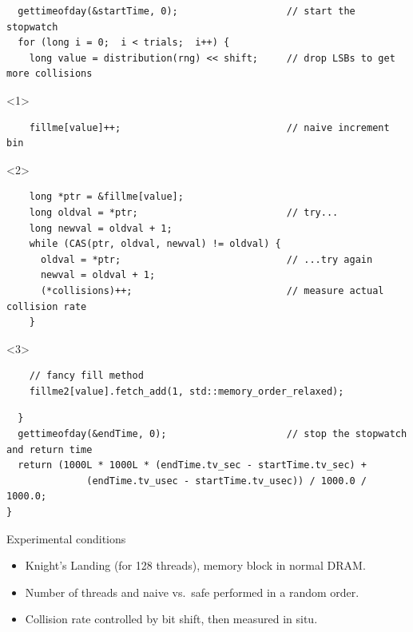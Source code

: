 \documentclass{beamer}
\begin{document}
\begin{frame}[fragile]{}
\begin{verbatim}
  gettimeofday(&startTime, 0);                   // start the stopwatch
  for (long i = 0;  i < trials;  i++) {
    long value = distribution(rng) << shift;     // drop LSBs to get more collisions
\end{verbatim}
\begin{onlyenv}<1>
\begin{verbatim}
    fillme[value]++;                             // naive increment bin
\end{verbatim}
\end{onlyenv}
\begin{onlyenv}<2>
\begin{verbatim}
    long *ptr = &fillme[value];
    long oldval = *ptr;                          // try...
    long newval = oldval + 1;
    while (CAS(ptr, oldval, newval) != oldval) {
      oldval = *ptr;                             // ...try again
      newval = oldval + 1;
      (*collisions)++;                           // measure actual collision rate
    }
\end{verbatim}
\end{onlyenv}
\begin{onlyenv}<3>
\begin{verbatim}
    // fancy fill method
    fillme2[value].fetch_add(1, std::memory_order_relaxed);
\end{verbatim}
\end{onlyenv}
\begin{verbatim}
  }
  gettimeofday(&endTime, 0);                     // stop the stopwatch and return time
  return (1000L * 1000L * (endTime.tv_sec - startTime.tv_sec) +
              (endTime.tv_usec - startTime.tv_usec)) / 1000.0 / 1000.0;
}
\end{verbatim}
\end{frame}

\begin{frame}{Experimental conditions}
\Large
\begin{itemize}\setlength{\itemsep}{0.5 cm}
\item Knight's Landing (for 128 threads), memory block in normal DRAM.
\item Number of threads and naive vs.\ safe performed in a random order.
\item Collision rate controlled by bit shift, then measured in situ.
\end{itemize}
\end{frame}
\end{document}
